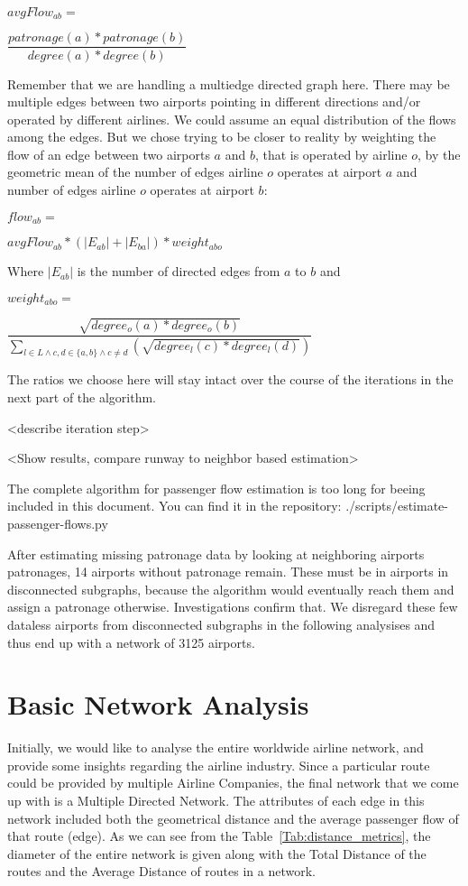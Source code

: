 \documentclass[twocolumn]{tum-article}
\begin{document}
$avgFlow_{ab} = $

$\dfrac{patronage(a) * patronage(b)}{degree(a) * degree(b)}$ 

Remember that we are handling a multiedge directed graph here. There may be multiple edges between two airports pointing in different directions and/or operated by different airlines.
We could assume an equal distribution of the flows among the edges. But we chose trying to be closer to reality by weighting the flow of an edge between two airports $a$ and $b$, that is operated by airline $o$, by the geometric mean of the number of edges airline $o$ operates at airport $a$ and number of edges airline $o$ operates at airport $b$: 

$flow_{ab} = $

$avgFlow_{ab} * (|E_{ab}|+|E_{ba}|) * weight_{abo}$

Where $|E_{ab}|$ is the number of directed edges from $a$ to $b$ and

$weight_{abo} = $

$\dfrac{\sqrt{degree_{o}(a) * degree_{o}(b)}}{\displaystyle\sum_{l \in L \land c,d \in \{a,b\} \land c \neq d}(\sqrt{degree_{l}(c) * degree_{l}(d)})}$  

The ratios we choose here will stay intact over the course of the iterations in the next part of the algorithm. 

<describe iteration step>

<Show results, compare runway to neighbor based estimation>

The complete algorithm for passenger flow estimation is too long for beeing included in this document. You can find it in the repository: ./scripts/estimate-passenger-flows.py

After estimating missing patronage data by looking at neighboring airports patronages, 14 airports without patronage remain. These must be in airports in disconnected subgraphs, because the algorithm would eventually reach them and assign a patronage otherwise. Investigations confirm that. We disregard these few dataless airports from disconnected subgraphs in the following analysises and thus end up with a network of 3125 airports. 


\section{Basic Network Analysis}
Initially, we would like to analyse the entire worldwide airline network, and provide some insights regarding the airline industry.
Since a particular route could be provided by multiple Airline Companies, the final network that we come up with is a Multiple Directed Network.
The attributes of each edge in this network included both the geometrical distance and the average passenger flow of that route (edge). 
As we can see from the Table~\ref{Tab:distance_metrics}, the diameter of the entire network is given along with the Total Distance of the routes and the Average Distance of routes in a network.  
\end{document}
